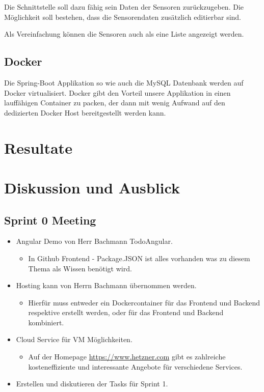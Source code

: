 \documentclass[a4paper]{article}
\begin{document}
	Die Schnittstelle soll dazu fähig sein Daten der Sensoren zurückzugeben. Die Möglichkeit soll bestehen, dass die Sensorendaten zusätzlich editierbar sind.
	
	Als Vereinfachung können die Sensoren auch als eine Liste angezeigt werden.
	
	\subsection{Docker}
	Die Spring-Boot Applikation so wie auch die MySQL Datenbank werden auf Docker virtualisiert. Docker gibt den Vorteil unsere Applikation in einen lauffähigen Container zu packen, der dann mit wenig Aufwand auf den dedizierten Docker Host bereitgestellt werden kann.
	
	\section{Resultate}
	\section{Diskussion und Ausblick}
	
	\subsection{Sprint 0 Meeting}
	\begin{itemize}
		\item Angular Demo von  Herr Bachmann TodoAngular.
		\begin{itemize}
			\item In Github Frontend - Package.JSON ist alles vorhanden was zu diesem Thema als Wissen benötigt wird.
		\end{itemize}
		\item Hosting kann von Herrn Bachmann übernommen werden.
		\begin{itemize}
			\item Hierfür muss entweder ein Dockercontainer für das Frontend und Backend respektive erstellt werden, oder für das Frontend und Backend kombiniert.
		\end{itemize}
		\item Cloud Service für VM Möglichkeiten.
		\begin{itemize}
			\item Auf der Homepage \url{https://www.hetzner.com} gibt es zahlreiche kosteneffiziente und interessante Angebote für verschiedene Services.
		\end{itemize}
		\item Erstellen und diskutieren der Tasks für Sprint 1.
	\end{itemize}	
	
\end{document}
